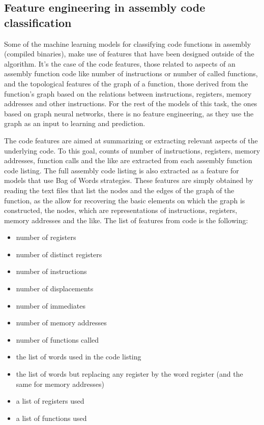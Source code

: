 \begin{appendices}
\section{Feature engineering in assembly code classification}\label{annex:feature_engineering}

Some of the machine learning models for classifying code functions in assembly (compiled binaries), make use of features that have been designed outside of the algorithm. It's the case of the code features, those related to aspects of an assembly function code like number of instructions or number of called functions, and the topological features of the graph of a function, those derived from the function's graph based on the relations between instructions, registers, memory addresses and other instructions. 
For the rest of the models of this task, the ones based on graph neural networks, there is no feature engineering, as they use the graph as an input to learning and prediction.

The code features are aimed at summarizing or extracting relevant aspects of the underlying code. To this goal, counts of number of instructions, registers, memory addresses, function calls and the like are extracted from each assembly function code listing. The full assembly code listing is also extracted as a feature for models that use Bag of Words strategies. These features are simply obtained by reading the text files that list the nodes and the edges of the graph of the function, as the allow for recovering the basic elements on which the graph is constructed, the nodes, which are representations of instructions, registers, memory addresses and the like.
The list of features from code is the following:
\begin{itemize}
	\item  number of registers
	\item number of distinct registers
	\item number of instructions
	\item number of displacements
	\item number of immediates
	\item number of memory addresses
	\item number of functions called
	\item the list of words used in the code listing
	\item the list of words but replacing any register by the word register (and the same for memory addresses)
	\item a list of registers used
	\item a list of functions used
\end{itemize}


\end{appendices}
